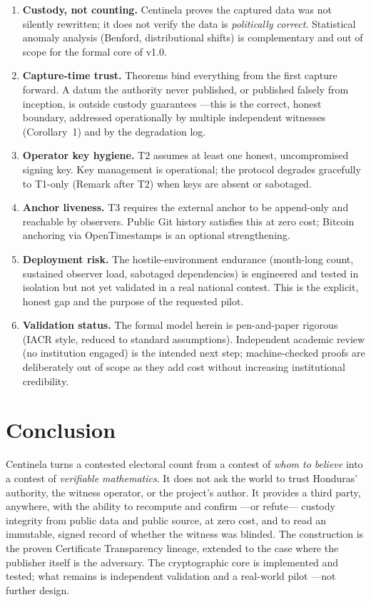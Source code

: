 \documentclass[11pt,a4paper]{article}
\theoremstyle{plain}
\theoremstyle{definition}
\theoremstyle{remark}
\begin{document}
\begin{enumerate}[leftmargin=1.4em]
  \item \textbf{Custody, not counting.} Centinela proves the captured
  data was not silently rewritten; it does not verify the data is
  \emph{politically correct}. Statistical anomaly analysis (Benford,
  distributional shifts) is complementary and out of scope for the
  formal core of v1.0.
  \item \textbf{Capture-time trust.} Theorems bind everything from the
  first capture forward. A datum the authority never published, or
  published falsely from inception, is outside custody guarantees ---this
  is the correct, honest boundary, addressed operationally by multiple
  independent witnesses (Corollary~1) and by the degradation log.
  \item \textbf{Operator key hygiene.} T2 assumes at least one honest,
  uncompromised signing key. Key management is operational; the protocol
  degrades gracefully to T1-only (Remark after T2) when keys are absent
  or sabotaged.
  \item \textbf{Anchor liveness.} T3 requires the external anchor to be
  append-only and reachable by observers. Public Git history satisfies
  this at zero cost; Bitcoin anchoring via OpenTimestamps is an optional
  strengthening.
  \item \textbf{Deployment risk.} The hostile-environment endurance
  (month-long count, sustained observer load, sabotaged dependencies) is
  engineered and tested in isolation but not yet validated in a real
  national contest. This is the explicit, honest gap and the purpose of
  the requested pilot.
  \item \textbf{Validation status.} The formal model herein is
  pen-and-paper rigorous (IACR style, reduced to standard assumptions).
  Independent academic review (no institution engaged) is the
  intended next step; machine-checked proofs are deliberately out of
  scope as they add cost without increasing institutional credibility.
\end{enumerate}

\section{Conclusion}

Centinela turns a contested electoral count from a contest of
\emph{whom to believe} into a contest of \emph{verifiable mathematics}.
It does not ask the world to trust Honduras' authority, the witness
operator, or the project's author. It provides a third party, anywhere,
with the ability to recompute and confirm ---or refute--- custody
integrity from public data and public source, at zero cost, and to read
an immutable, signed record of whether the witness was blinded. The
construction is the proven Certificate Transparency lineage, extended to
the case where the publisher itself is the adversary. The cryptographic
core is implemented and tested; what remains is independent validation
and a real-world pilot ---not further design.
\end{document}
